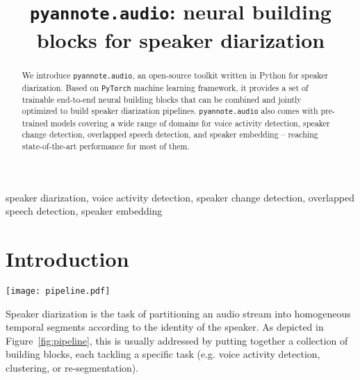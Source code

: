\documentclass{article}
\title{\texttt{pyannote.audio}: neural building blocks for speaker diarization}
\begin{document}
\maketitle

\begin{abstract}
We introduce {\small \texttt{pyannote.audio}}, an open-source toolkit written in Python for speaker diarization.
Based on {\small \texttt{PyTorch}} machine learning framework, it provides a set of trainable end-to-end neural building blocks that can be combined and jointly optimized to build speaker diarization pipelines.
{\small \texttt{pyannote.audio}} also comes with pre-trained models covering a wide range of domains for voice activity detection, speaker change detection, overlapped speech detection, and speaker embedding -- reaching state-of-the-art performance for most of them.
\end{abstract}

\begin{keywords}
speaker diarization, voice activity detection, speaker change detection, overlapped speech detection, speaker embedding
\end{keywords}

\vspace{-0.17cm}
\section{Introduction}
\label{sec:intro}

\begin{figure*}[htb]
    \centering
    \texttt{[image: pipeline.pdf]}
    \caption{{\small \texttt{pyannote.audio}} provides a collection of modules that can be jointly optimized to build a speaker diarization pipeline.}
    \label{fig:pipeline}
\end{figure*}

Speaker diarization is the task of partitioning an audio stream into homogeneous temporal segments according to the identity of the speaker. As depicted in Figure~\ref{fig:pipeline}, this is usually addressed by putting together a collection of building blocks, each tackling a specific task (e.g. voice activity detection, clustering, or re-segmentation).
\end{document}

